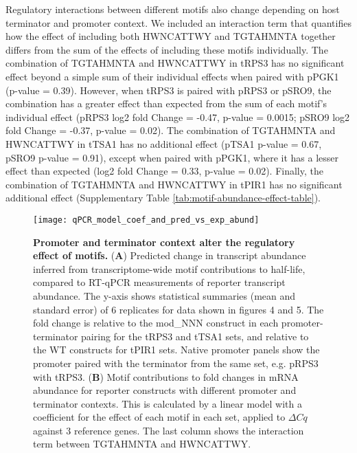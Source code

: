 \documentclass[../main.tex]{subfiles}
\begin{document}
Regulatory interactions between different motifs also change depending on host terminator and promoter context.
We included an interaction term that quantifies how the effect of including both HWNCATTWY and TGTAHMNTA together differs from the sum of the effects of including these motifs individually.
The combination of TGTAHMNTA and HWNCATTWY in tRPS3 has no significant effect beyond a simple sum of their individual effects when paired with pPGK1 (p-value = 0.39).
However, when tRPS3 is paired with pRPS3 or pSRO9, the combination has a greater effect than expected from the sum of each motif's individual effect (pRPS3 log2 fold Change = -0.47, p-value = 0.0015; pSRO9 log2 fold Change = -0.37, p-value = 0.02).
The combination of TGTAHMNTA and HWNCATTWY in tTSA1 has no additional effect (pTSA1 p-value = 0.67, pSRO9 p-value = 0.91), except when paired with pPGK1, where it has a lesser effect than expected (log2 fold Change = 0.33, p-value = 0.02).
Finally, the combination of TGTAHMNTA and HWNCATTWY in tPIR1 has no significant additional effect (Supplementary Table \ref{tab:motif-abundance-effect-table}).

\begin{figure}[p]

{\centering \texttt{[image: qPCR\_model\_coef\_and\_pred\_vs\_exp\_abund]} 

}

\caption[Promoter and terminator context alter the regulatory effect of motifs.]{\textbf{Promoter and terminator context alter the regulatory effect of motifs.} (\textbf{A}) Predicted change in transcript abundance inferred from transcriptome-wide motif contributions to half-life, compared to RT-qPCR measurements of reporter transcript abundance. The y-axis shows statistical summaries (mean and standard error) of 6 replicates for data shown in figures 4 and 5. The fold change is relative to the mod\_NNN construct in each promoter-terminator pairing for the tRPS3 and tTSA1 sets, and relative to the WT constructs for tPIR1 sets. Native promoter panels show the promoter paired with the terminator from the same set, e.g. pRPS3 with tRPS3. (\textbf{B}) Motif contributions to fold changes in mRNA abundance for reporter constructs with different promoter and terminator contexts. This is calculated by a linear model with a coefficient for the effect of each motif in each set, applied to $\Delta Cq$ against 3 reference genes. The last column shows the interaction term between TGTAHMNTA and HWNCATTWY.}\label{fig:hlife-predict-vs-abundance-and-motif-context-dependence}
\end{figure}
\end{document}
